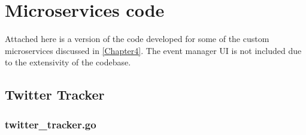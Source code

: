 
\chapter{Microservices code} %

\label{AppendixA} %

Attached here is a version of the code developed for some of the custom microservices discussed in \autoref{Chapter4}. The event manager UI is not included due to the extensivity of the codebase.

\section{Twitter Tracker}

\subsection{twitter\_tracker.go}

